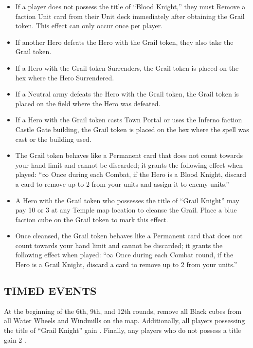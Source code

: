 \begin{multicols*}{2}
\begin{itemize}
  \item If a player does not possess the title of ``\textcolor{darkcandyapplered}{Blood Knight},'' they must Remove a faction Unit card from their Unit deck immediately after obtaining the Grail token. This effect can only occur once per player.
  \item If another Hero defeats the Hero with the Grail token, they also take the Grail token.
  \item If a Hero with the Grail token Surrenders, the Grail token is placed on the hex where the Hero Surrendered.
  \item If a Neutral army defeats the Hero with the Grail token, the Grail token is placed on the field where the Hero was defeated.
  \item If a Hero with the Grail token casts Town Portal or uses the Inferno faction Castle Gate building, the Grail token is placed on the hex where the spell was cast or the building used.
  \item The Grail token behaves like a Permanent card that does not count towards your hand limit and cannot be discarded; it grants the following effect when played: ``$\infty$ Once during each Combat, if the Hero is a \textcolor{darkcandyapplered}{Blood Knight}, discard a card to remove up to 2  from your units and assign it to enemy units.''
  \item A Hero with the Grail token who possesses the title of ``\textcolor{darkcerulean}{Grail Knight}'' may pay 10  or 3  at any Temple map location to cleanse the Grail. Place a blue faction cube on the Grail token to mark this effect.
  \item Once cleansed, the Grail token behaves like a Permanent card that does not count towards your hand limit and cannot be discarded; it grants the following effect when played: ``$\infty$ Once during each Combat round, if the Hero is a \textcolor{darkcerulean}{Grail Knight}, discard a card to remove up to 2  from your units.''
\end{itemize}

\subsection*{\MakeUppercase{Timed Events}}
At the beginning of the 6th, 9th, and 12th rounds, remove all Black cubes from all Water Wheels and Windmills on the map. Additionally, all players possessing the title of ``\textcolor{darkcerulean}{Grail Knight}'' gain . Finally, any players who do not possess a title gain 2 .
\end{multicols*}

